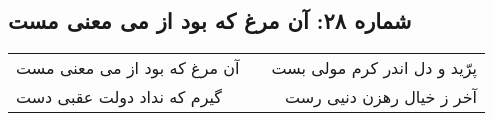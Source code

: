 \begin{center}
\section*{شماره ۲۸: آن مرغ که بود از می معنی مست}
\label{sec:028}
\begin{longtable}{l p{0.5cm} r}
آن مرغ که بود از می معنی مست
&&
پرّید و دل اندر کرم مولی بست
\\
گیرم که نداد دولت عقبی دست
&&
آخر ز خیال رهزن دنیی رست
\\
\end{longtable}
\end{center}
